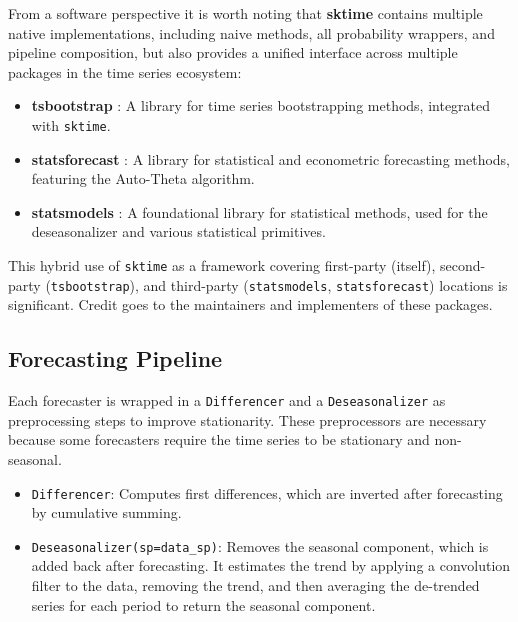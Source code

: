 From a software perspective it is worth noting that \textbf{sktime} \cite{loning2019sktime, franz_kiraly_2024_11095261_sktime} contains multiple native implementations, including naive methods, all probability wrappers, and pipeline composition, but also provides a unified interface across multiple packages in the time series ecosystem:

\begin{itemize}
    \item \textbf{tsbootstrap} \cite{gilda_2024_10866090_tsbootstrap, gilda2024tsbootstrap}: A library for time series bootstrapping methods, integrated with \texttt{sktime}.
    \item \textbf{statsforecast} \cite{garza2022statsforecast}: A library for statistical and econometric forecasting methods, featuring the Auto-Theta algorithm.
    \item \textbf{statsmodels} \cite{seabold2010statsmodels}: A foundational library for statistical methods, used for the deseasonalizer and various statistical primitives.
\end{itemize}

This hybrid use of \texttt{sktime} as a framework covering first-party (itself), second-party (\texttt{tsbootstrap}), and third-party (\texttt{statsmodels}, \texttt{statsforecast}) locations is significant. Credit goes to the maintainers and implementers of these packages.

\subsection{Forecasting Pipeline}
Each forecaster is wrapped in a \texttt{Differencer} and a \texttt{Deseasonalizer} as preprocessing steps to improve stationarity. These preprocessors are necessary because some forecasters require the time series to be stationary and non-seasonal.

\begin{itemize}
    \item \texttt{Differencer}: Computes first differences, which are inverted after forecasting by cumulative summing.
    \item \texttt{Deseasonalizer(sp=data\_sp)}: Removes the seasonal component, which is added back after forecasting. It estimates the trend by applying a convolution filter to the data, removing the trend, and then averaging the de-trended series for each period to return the seasonal component.
\end{itemize}


